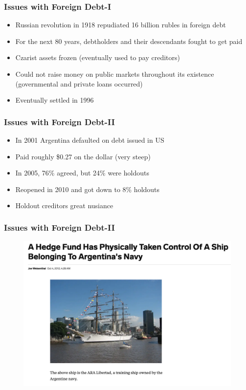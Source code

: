 \documentclass{beamer}
\begin{document}
\begin{frame}
\frametitle{Issues with Foreign Debt-I }
\begin{itemize}
\item Russian revolution in 1918 repudiated 16 billion rubles in foreign debt
\bigskip
\item For the next 80 years, debtholders and their descendants fought to get paid
\bigskip
\item Czarist assets frozen (eventually used to pay creditors)
\bigskip
\item Could not raise money on public markets throughout its existence (governmental and private loans occurred)
\bigskip
\item Eventually settled in 1996
\end{itemize}
\end{frame}


\begin{frame}
\frametitle{Issues with Foreign Debt-II }
\begin{itemize}
\item In 2001 Argentina defaulted on debt issued in US 
\bigskip
\item Paid roughly \$0.27 on the dollar (very steep)
\bigskip
\item In 2005, 76\% agreed, but 24\% were holdouts
\bigskip
\item Reopened in 2010 and got down to 8\% holdouts
\bigskip
\item Holdout creditors great nusiance
\end{itemize}
\end{frame}

\begin{frame}
\frametitle{Issues with Foreign Debt-II}
\begin{figure}
\centering
\includegraphics[scale=0.3]{Liberdad.png}
\end{figure}
\end{frame}
\end{document}
